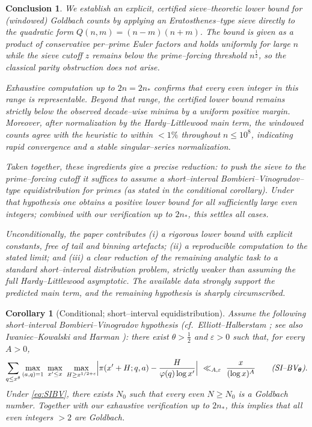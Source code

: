 \documentclass[11pt]{article}
\theoremstyle{inline}
\theoremstyle{break}
\theoremstyle{break}
\newtheorem*{conclusion}{Conclusion}
\theoremstyle{break}
\theoremstyle{break}
\theoremstyle{break}
\theoremstyle{break}
\newtheorem{corollary}{Corollary}
\theoremstyle{break}
\theoremstyle{inline}
\begin{document}
\begin{conclusion}\label{sec:conclusion}
We establish an explicit, certified sieve–theoretic lower bound for (windowed) Goldbach counts by applying an Eratosthenes–type sieve directly to the quadratic form \(Q(n,m)=(n-m)(n+m)\). The bound is given as a product of conservative per–prime Euler factors and holds uniformly for large \(n\) while the sieve cutoff \(z\) remains below the prime–forcing threshold \(n^{\frac{1}{2}}\), so the classical parity obstruction does not arise.

Exhaustive computation up to \(2n=2n_\ast\) confirms that every even integer in this range is representable. Beyond that range, the certified lower bound remains strictly below the observed decade–wise minima by a uniform positive margin. Moreover, after normalization by the Hardy–Littlewood main term, the windowed counts agree with the heuristic to within \(<1\%\) throughout \(n\le 10^{8}\), indicating rapid convergence and a stable singular–series normalization.

Taken together, these ingredients give a precise reduction: to push the sieve to the prime–forcing cutoff it suffices to assume a short–interval Bombieri–Vinogradov–type equidistribution for primes (as stated in the conditional corollary). Under that hypothesis one obtains a positive lower bound for all sufficiently large even integers; combined with our verification up to \(2n_\ast\), this settles all cases.

Unconditionally, the paper contributes (i) a rigorous lower bound with explicit constants, free of tail and binning artefacts; (ii) a reproducible computation to the stated limit; and (iii) a clear reduction of the remaining analytic task to a standard short–interval distribution problem, strictly weaker than assuming the full Hardy–Littlewood asymptotic. The available data strongly support the predicted main term, and the remaining hypothesis is sharply circumscribed.
\end{conclusion}

\begin{corollary}[Conditional; short–interval equidistribution]\label{cor:SI-BV}
Assume the following short–interval Bombieri–Vinogradov hypothesis (cf.\ Elliott–Halberstam \cite{ElliottHalberstam1968}; see also Iwaniec–Kowalski \cite[Chs.~17–18]{IwaniecKowalski2004} and Harman \cite[Chs.~17,~28]{Harman2007}): there exist \( \theta>\tfrac{1}{2} \) and \( \varepsilon>0 \) such that, for every \(A>0\),
\begin{equation}\label{eq:SIBV}
\sum_{q\le x^{\theta}}
\max_{(a,q)=1}\ \max_{x'\le x}\ \max_{H\ge x^{1/2+\varepsilon}}
\Bigl|\pi(x'+H;q,a)-\frac{H}{\varphi(q)\log x'}\Bigr|
\ \ll_{A,\varepsilon}\ \frac{x}{(\log x)^A}
\qquad \text{\emph{(SI--BV\(\boldsymbol{_\theta}\))}}.
\end{equation}
Under \eqref{eq:SIBV}, there exists \( N_0 \) such that every even \( N\ge N_0 \) is a Goldbach number. Together with our exhaustive verification up to \( 2n_\ast \), this implies that all even integers \(>2\) are Goldbach.
\end{corollary}
\end{document}
